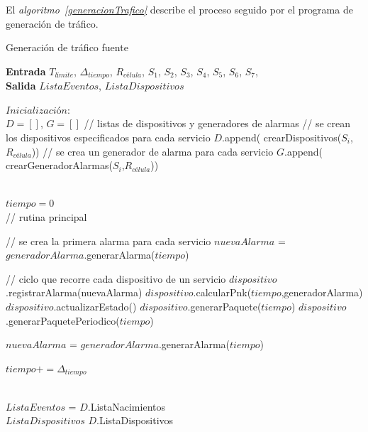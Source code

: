 El \textit{algoritmo~\ref{generacionTrafico}} describe el proceso seguido por el programa de generación de tráfico.

\begin{algorithm}
    \caption{Generación de tráfico fuente}
    \label{generacionTrafico}
    \hspace*{\algorithmicindent} \textbf{Entrada} $T_{límite}$, $\Delta_{tiempo}$, $R_{célula}$, $S_1$, $S_2$, $S_3$, $S_4$, $S_5$, $S_6$, $S_7$, \\
    \hspace*{\algorithmicindent} \textbf{Salida} $ListaEventos$, $ListaDispositivos$
    \begin{algorithmic}[1]

    $Inicialización: $ \\
    $D=[ ]$, $G=[ ]$ // listas de dispositivos y generadores de alarmas
    \State // se crean los dispositivos especificados para cada servicio 
    \State$D$.append( crearDispositivos($S_i$,$R_{célula}$)) 
    \State// se crea un generador de alarma para cada servicio
    \State$G$.append( crearGeneradorAlarmas($S_i$,$R_{célula}$)) 
    
    \EndFor \\
$tiempo=0$ \\

// rutina principal

            \State// se crea la primera alarma para cada servicio 
            \State$nuevaAlarma$ = $generadorAlarma$.generarAlarma($tiempo$) 
            
            \EndIf

            \State// ciclo que recorre cada dispositivo de un servicio
            \State$dispositivo$.registrarAlarma(nuevaAlarma)
            \State$dispositivo$.calcularPnk($tiempo$,generadorAlarma)
            \State$dispositivo$.actualizarEstado()
            \State$dispositivo$.generarPaquete($tiempo$)
            \Else 
            \State$dispositivo$.generarPaquetePeriodico($tiempo$)
            
            \EndIf
            
            \EndFor
            \State$nuevaAlarma$ = $generadorAlarma$.generarAlarma($tiempo$)
        
        \EndFor 
        \State$tiempo+=\Delta_{tiempo}$ 
    
    \EndWhile \\
    $ListaEventos$ = $D$.ListaNacimientos\\
    $ListaDispositivos$ $D$.ListaDispositivos\\
    \EndProcedure
    \end{algorithmic}
\end{algorithm}

